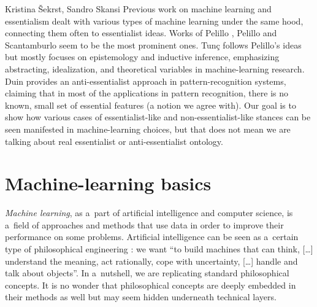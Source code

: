 \begin{artengenv2auth}{Kristina Šekrst, Sandro Skansi}
Previous work on machine learning and essentialism dealt with various types of machine learning under the same hood, connecting them often to essentialist ideas. Works of Pelillo
\parencite*[][]{pelillo_introduction_2013}, %
 Pelillo and Scantamburlo 
\parencite*[][]{hutchison_how_2013} %
 seem to be the most prominent ones. Tunç 
\parencite*[][]{tunc_semantics_2015} %
 follows Pelillo's 
\parencite*[][]{pelillo_introduction_2013} %
 ideas but mostly focuses on epistemology and inductive inference, emphasizing abstracting, idealization, and theoretical variables in machine-learning research. Duin 
\parencite*[][]{duin_dissimilarity_2015} %
 provides an anti-essentialist approach in pattern-recognition systems, claiming that in most of the applications in pattern recognition, there is no known, small set of essential features (a notion we agree with). Our goal is to show how various cases of essentialist-like and non-essentialist-like stances can be seen manifested in machine-learning choices, but that does not mean we are talking about real essentialist or anti-essentialist ontology.

\section*{Machine-learning basics}
\textit{Machine learning}, as a~part of artificial intelligence and computer science, is a~field of approaches and methods that use data in order to improve their performance on some problems. Artificial intelligence can be seen as a~certain type of philosophical engineering
\parencite[][p.vii]{skansi_introduction_2018}: %
 we want ``to build machines that can think, [\ldots] understand the meaning, act rationally, cope with uncertainty, [\ldots] handle and talk about objects''. In a~nutshell, we are replicating standard philosophical concepts. It is no wonder that philosophical concepts are deeply embedded in their methods as well but may seem hidden underneath technical layers.


\end{artengenv2auth}
